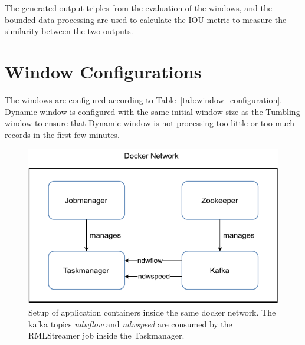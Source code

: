 The generated output triples from the evaluation of the windows, and the bounded data processing are 
used to calculate the IOU metric to measure the similarity between the two outputs.    


\section{Window Configurations}
\label{sec:Window Configurations}
The windows are configured according to Table~\ref{tab:window_configuration}. 
Dynamic window is configured with the same initial window size as the 
Tumbling window to ensure that Dynamic window is not processing too little or too much 
records in the first few minutes. 


\begin{figure}[htpb]
    \centering
    \includegraphics[width=0.8\linewidth]{fig/docker_setup.pdf}
    \caption[Setup of application containers inside the same docker network.]{ 
Setup of application containers inside the same docker network.
The kafka topics \emph{ndwflow} and \emph{ndwspeed} are consumed by the 
RMLStreamer job inside the Taskmanager.}
    \label{fig:docker_setup}
\end{figure}

